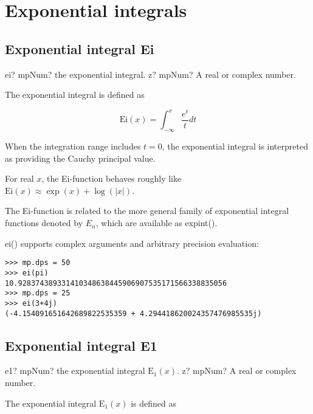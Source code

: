 \section{Exponential integrals}
\subsection{Exponential integral Ei}


\begin{mpFunctionsExtract}
	\mpFunctionOne
	{ei? mpNum? the exponential integral.}
	{z? mpNum? A real or complex number.}
\end{mpFunctionsExtract}

\vpara
The exponential integral is defined as

\begin{equation}
\text{Ei}(x) = \int_{-\infty}^x \frac{e^t}{t} dt
\end{equation}

When the integration range includes $t=0$, the exponential integral is interpreted as providing the Cauchy principal value.

For real $x$, the Ei-function behaves roughly like $\text{Ei}(x) \approx \exp(x) + \log(|x|)$.

The Ei-function is related to the more general family of exponential integral functions
denoted by $E_n$, which are available as expint().

ei() supports complex arguments and arbitrary precision evaluation:

\begin{lstlisting}
>>> mp.dps = 50
>>> ei(pi)
10.928374389331410348638445906907535171566338835056
>>> mp.dps = 25
>>> ei(3+4j)
(-4.154091651642689822535359 + 4.294418620024357476985535j)
\end{lstlisting}



\subsection{Exponential integral E1}

\begin{mpFunctionsExtract}
	\mpFunctionOne
	{e1? mpNum? the exponential integral $\text{E}_1(x)$.}
	{z? mpNum? A real or complex number.}
\end{mpFunctionsExtract}


The exponential integral $\text{E}_1(x)$ is defined as


